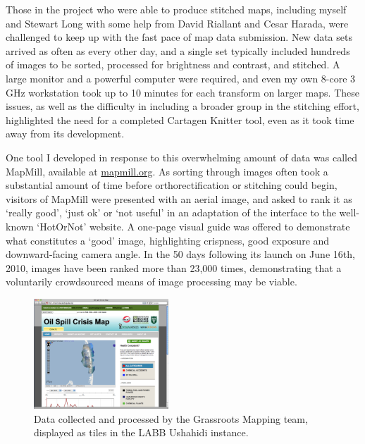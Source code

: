 \documentclass[11pt,oneside,notitlepage]{report}
\begin{document}
{{Those in the project who were able to produce stitched maps, including myself and Stewart Long with some help from David Riallant and Cesar Harada, were challenged to keep up with the fast pace of map data submission. New data sets arrived as often as every other day, and a single set typically included hundreds of images to be sorted, processed for brightness and contrast, and stitched. A large monitor and a powerful computer were required, and even my own 8-core 3 GHz workstation took up to 10 minutes for each transform on larger maps. These issues, as well as the difficulty in including a broader group in the stitching effort, highlighted the need for a completed Cartagen Knitter tool, even as it took time away from its development. 

One tool I developed in response to this overwhelming amount of data was called MapMill, available at \href{http://mapmill.org}{mapmill.org}. As sorting through images often took a substantial amount of time before orthorectification or stitching could begin, visitors of MapMill were presented with an aerial image, and asked to rank it as `really good', `just ok' or `not useful' in an adaptation of the interface to the well-known `HotOrNot' website. A one-page visual guide was offered to demonstrate what constitutes a `good' image, highlighting crispness, good exposure and downward-facing camera angle. In the 50 days following its launch on June 16th, 2010, images have been ranked more than 23,000 times, demonstrating that a voluntarily crowdsourced means of image processing may be viable. 

\begin{figure}
	\begin{flushright}
		\includegraphics[width=0.45\textwidth]{images/labb-ushahidi.png}
		\caption{Data collected and processed by the Grassroots Mapping team, displayed as tiles in the LABB Ushahidi instance.}
	\end{flushright}
\end{figure}

}}
\end{document}
